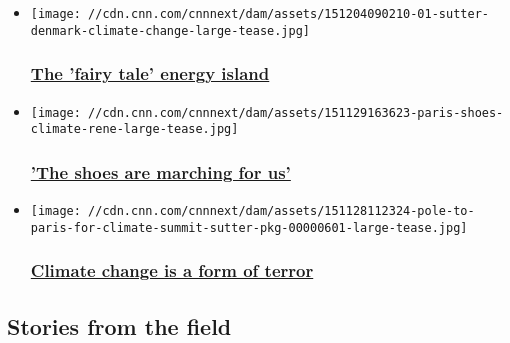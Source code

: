 \begin{itemize}
\item
  \href{/2015/12/04/opinions/sutter-samso-denmark-climate-change-two-degrees/index.html}{}

  \texttt{[image: //cdn.cnn.com/cnnnext/dam/assets/151204090210-01-sutter-denmark-climate-change-large-tease.jpg]}

  \hypertarget{the-fairy-tale-energy-island-}{%
  \subsubsection{\texorpdfstring{\href{/2015/12/04/opinions/sutter-samso-denmark-climate-change-two-degrees/index.html}{The
  'fairy tale' energy island
  }}{The 'fairy tale' energy island }}\label{the-fairy-tale-energy-island-}}
\item
  \href{/2015/11/29/opinions/sutter-climate-demonstration-paris-cop21/index.html}{}

  \texttt{[image: //cdn.cnn.com/cnnnext/dam/assets/151129163623-paris-shoes-climate-rene-large-tease.jpg]}

  \hypertarget{the-shoes-are-marching-for-us}{%
  \subsubsection{\texorpdfstring{\href{/2015/11/29/opinions/sutter-climate-demonstration-paris-cop21/index.html}{'The
  shoes are marching for
  us'}}{'The shoes are marching for us'}}\label{the-shoes-are-marching-for-us}}
\item
  \href{/2015/11/28/opinions/sutter-cop21-paris-preview-two-degrees/index.html}{}

  \texttt{[image: //cdn.cnn.com/cnnnext/dam/assets/151128112324-pole-to-paris-for-climate-summit-sutter-pkg-00000601-large-tease.jpg]}

  \hypertarget{climate-change-is-a-form-of-terror}{%
  \subsubsection{\texorpdfstring{\href{/2015/11/28/opinions/sutter-cop21-paris-preview-two-degrees/index.html}{Climate
  change is a form of
  terror}}{Climate change is a form of terror}}\label{climate-change-is-a-form-of-terror}}
\end{itemize}

\hypertarget{stories-from-the-field-}{%
\subsection{Stories from the field~}\label{stories-from-the-field-}}

